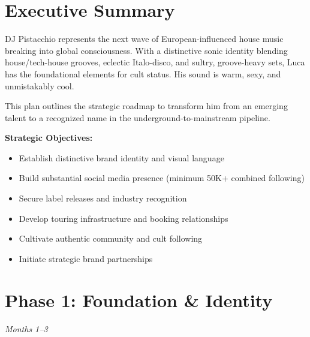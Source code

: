 \documentclass[11pt,a4paper]{article}
\begin{document}
\tableofcontents
\thispagestyle{empty}
\newpage
\setcounter{page}{1}

\section{Executive Summary}

\begin{executivebox}
DJ Pistacchio represents the next wave of European-influenced house music breaking into global consciousness. With a distinctive sonic identity blending house/tech-house grooves, eclectic Italo-disco, and sultry, groove-heavy sets, Luca has the foundational elements for cult status. His sound is warm, sexy, and unmistakably cool. 

\vspace{0.5em}

This plan outlines the strategic roadmap to transform him from an emerging talent to a recognized name in the underground-to-mainstream pipeline.
\end{executivebox}

\vspace{1em}

\noindent\textbf{Strategic Objectives:}
\begin{itemize}[leftmargin=*]
    \item Establish distinctive brand identity and visual language
    \item Build substantial social media presence (minimum 50K+ combined following)
    \item Secure label releases and industry recognition
    \item Develop touring infrastructure and booking relationships
    \item Cultivate authentic community and cult following
    \item Initiate strategic brand partnerships
\end{itemize}

\section{Phase 1: Foundation \& Identity}
\textit{Months 1--3}
\end{document}
